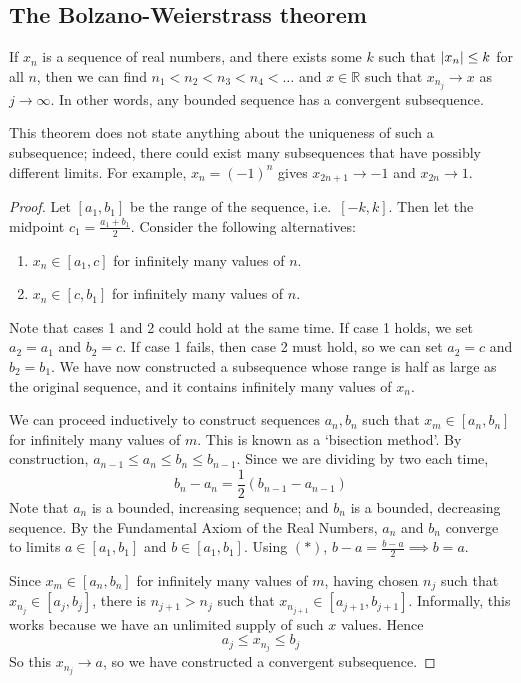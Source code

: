\subsection{The Bolzano-Weierstrass theorem}
\begin{theorem}
	If \(x_n\) is a sequence of real numbers, and there exists some \(k\) such that \(\abs{x_n} \leq k\) for all \(n\), then we can find \(n_1 < n_2 < n_3 < n_4 < \dots\) and \(x \in \mathbb R\) such that \(x_{n_j} \to x\) as \(j \to \infty\).
	In other words, any bounded sequence has a convergent subsequence.
\end{theorem}
\begin{remark}
	This theorem does not state anything about the uniqueness of such a subsequence; indeed, there could exist many subsequences that have possibly different limits.
	For example, \(x_n = (-1)^n\) gives \(x_{2n+1} \to -1\) and \(x_{2n} \to 1\).
\end{remark}
\begin{proof}
	Let \([a_1, b_1]\) be the range of the sequence, i.e.\ \([-k, k]\).
	Then let the midpoint \(c_1 = \frac{a_1 + b_1}{2}\).
	Consider the following alternatives:
	\begin{enumerate}
		\item \(x_n \in [a_1, c]\) for infinitely many values of \(n\).
		\item \(x_n \in [c, b_1]\) for infinitely many values of \(n\).
	\end{enumerate}
	Note that cases 1 and 2 could hold at the same time.
	If case 1 holds, we set \(a_2 = a_1\) and \(b_2 = c\).
	If case 1 fails, then case 2 must hold, so we can set \(a_2 = c\) and \(b_2 = b_1\).
	We have now constructed a subsequence whose range is half as large as the original sequence, and it contains infinitely many values of \(x_n\).

	We can proceed inductively to construct sequences \(a_n, b_n\) such that \(x_m \in [a_n, b_n]\) for infinitely many values of \(m\).
	This is known as a `bisection method'.
	By construction, \(a_{n-1} \leq a_n \leq b_n \leq b_{n-1}\).
	Since we are dividing by two each time,
	\[
		b_n - a_n = \frac{1}{2}(b_{n-1} - a_{n-1}) \tag{\(\ast\)}
	\]
	Note that \(a_n\) is a bounded, increasing sequence; and \(b_n\) is a bounded, decreasing sequence.
	By the Fundamental Axiom of the Real Numbers, \(a_n\) and \(b_n\) converge to limits \(a \in [a_1, b_1]\) and \(b \in [a_1, b_1]\).
	Using \((\ast)\), \(b-a = \frac{b-a}{2} \implies b = a\).

	Since \(x_m \in [a_n, b_n]\) for infinitely many values of \(m\), having chosen \(n_j\) such that \(x_{n_j} \in [a_j, b_j]\), there is \(n_{j+1} > n_j\) such that \(x_{n_{j+1}} \in [a_{j+1}, b_{j+1}]\).
	Informally, this works because we have an unlimited supply of such \(x\) values.
	Hence
	\[
		a_j \leq x_{n_j} \leq b_j
	\]
	So this \(x_{n_j} \to a\), so we have constructed a convergent subsequence.
\end{proof}

